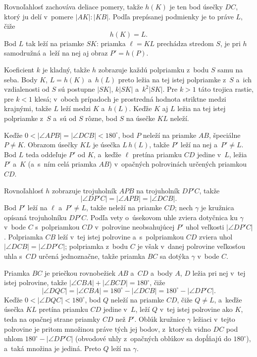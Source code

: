 {    Rovnoľahlosť zachováva deliace pomery, takže $h(K)$ je ten bod úsečky $DC$, ktorý ju delí v~pomere $|AK| : |KB|$. Podľa prepísanej podmienky je to práve $L$, čiže
    $$
    h(K) = L.
    $$
    Bod $L$ tak leží na priamke $SK$: priamka $\ell = KL$ prechádza stredom $S$, je pri $h$ samodružná a~leží na nej aj obraz $P' = h(P)$.

    Koeficient $k$ je kladný, takže $h$ zobrazuje každú polpriamku z~bodu $S$ samu na seba. Body $K$, $L = h(K)$ a~$h(L)$ preto ležia na tej istej polpriamke z~$S$ a~ich vzdialenosti od $S$ sú postupne $|SK|$, $k|SK|$ a~$k^2|SK|$. Pre $k > 1$ táto trojica rastie, pre $k < 1$ klesá; v~oboch prípadoch je prostredná hodnota striktne medzi krajnými, takže $L$ leží medzi $K$ a~$h(L)$. Keďže $K$ aj $L$ ležia na tej istej polpriamke z~$S$ a~sú od $S$ rôzne, bod $S$ na úsečke $KL$ neleží.

    Keďže $0 < |\angle APB| = |\angle DCB| < 180^\circ$, bod $P$ neleží na priamke $AB$, špeciálne $P \neq K$. Obrazom úsečky $KL$ je úsečka $L\,h(L)$, takže $P'$ leží na nej a~$P' \neq L$. Bod $L$ teda oddeľuje $P'$ od $K$, a~keďže $\ell$ pretína priamku $CD$ jedine v~$L$, ležia $P'$ a~$K$ (a~s~ním celá priamka $AB$) v~opačných polrovinách určených priamkou $CD$.

    Rovnoľahlosť $h$ zobrazuje trojuholník $APB$ na trojuholník $DP'C$, takže
    $$
    |\angle DP'C| = |\angle APB| = |\angle DCB|.
    $$
    Bod $P'$ leží na $\ell$ a~$P' \neq L$, takže neleží na priamke $CD$; nech $\gamma$ je kružnica opísaná trojuholníku $DP'C$. Podľa vety o~úsekovom uhle zviera dotyčnica ku $\gamma$ v~bode $C$ s~polpriamkou $CD$ v~polrovine neobsahujúcej $P'$ uhol veľkosti $|\angle DP'C|$. Polpriamka $CB$ leží v~tej istej polrovine a~s~polpriamkou $CD$ zviera uhol $|\angle DCB| = |\angle DP'C|$; polpriamka z~bodu $C$ je však v~danej polrovine veľkosťou uhla s~$CD$ určená jednoznačne, takže priamka $BC$ sa dotýka $\gamma$ v~bode $C$.

    Priamka $BC$ je priečkou rovnobežiek $AB$ a~$CD$ a~body $A$, $D$ ležia pri nej v~tej istej polrovine, takže $|\angle CBA| + |\angle BCD| = 180^\circ$, čiže
    $$
    |\angle DQC| = |\angle CBA| = 180^\circ - |\angle DCB| = 180^\circ - |\angle DP'C|.
    $$
    Keďže $0 < |\angle DQC| < 180^\circ$, bod $Q$ neleží na priamke $CD$, čiže $Q \neq L$, a~keďže úsečka $KL$ pretína priamku $CD$ jedine v~$L$, leží $Q$ v~tej istej polrovine ako $K$, teda na opačnej strane priamky $CD$ než $P'$. Oblúk kružnice $\gamma$ ležiaci v~tejto polrovine je pritom množinou práve tých jej bodov, z~ktorých vidno $DC$ pod uhlom $180^\circ - |\angle DP'C|$ (obvodové uhly z~opačných oblúkov sa dopĺňajú do $180^\circ$), a~taká množina je jediná. Preto $Q$ leží na $\gamma$.

}
